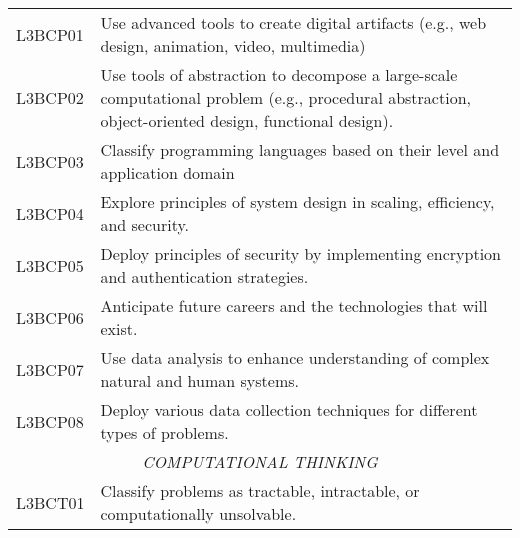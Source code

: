 \begin{longtable}{p{1.8cm}p{11cm}}
 L3BCP01 & Use advanced tools to create digital artifacts (e.g., web design, animation, video, multimedia)                                                                                                                            \\
 L3BCP02 & Use tools of abstraction to decompose a large-scale computational problem (e.g., procedural abstraction, object-oriented design, functional design).                                                                       \\
 L3BCP03 & Classify programming languages based on their level and application domain                                                                                                                                                 \\
 L3BCP04 & Explore principles of system design in scaling, efficiency, and security.                                                                                                                                                  \\
 L3BCP05 & Deploy principles of security by implementing encryption and authentication strategies.                                                                                                                                    \\
 L3BCP06 & Anticipate future careers and the technologies that will exist.                                                                                                                                                            \\
 L3BCP07 & Use data analysis to enhance understanding of complex natural and human systems.                                                                                                                                           \\
 L3BCP08 & Deploy various data collection techniques for different types of problems.                                                                                                                                                 \\
 \multicolumn{2}{c}{\textit{COMPUTATIONAL THINKING}}                                                                                                                                                                                                     \\
 L3BCT01 & Classify problems as tractable, intractable, or computationally unsolvable.                                                                                                                                                \\

\end{longtable}
